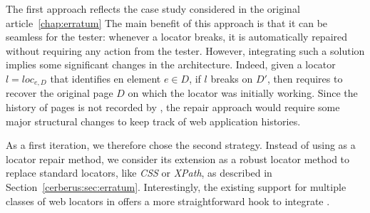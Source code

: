 The first approach reflects the case study considered in the original \erratum article~\ref{chap:erratum}
The main benefit of this approach is that it can be seamless for the tester: whenever a locator breaks, it is automatically repaired without requiring any action from the tester.
However, integrating such a solution implies some significant changes in the \cerberus architecture.
Indeed, given a locator $l = loc_{e,D}$ that identifies en element $e \in D$, if $l$ breaks on $D'$, then \erratum requires to recover the original page $D$ on which the locator was initially working.
Since the history of pages is not recorded by \cerberus, the repair approach would require some major structural changes to keep track of web application histories.

As a first iteration, we therefore chose the second strategy.
Instead of using \erratum as a locator repair method, we consider its extension as a robust locator method to replace standard locators, like \textit{CSS} or \textit{XPath}, as described in Section~\ref{cerberus:sec:erratum}.
Interestingly, the existing support for multiple classes of web locators in \cerberus offers a more straightforward hook to integrate \erratum.

